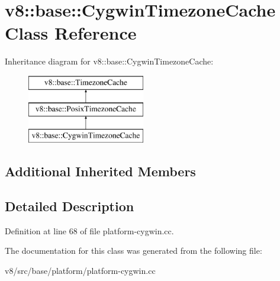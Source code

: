 \hypertarget{classv8_1_1base_1_1CygwinTimezoneCache}{}\section{v8\+:\+:base\+:\+:Cygwin\+Timezone\+Cache Class Reference}
\label{classv8_1_1base_1_1CygwinTimezoneCache}
Inheritance diagram for v8\+:\+:base\+:\+:Cygwin\+Timezone\+Cache\+:\begin{figure}[H]
\begin{center}
\leavevmode
\includegraphics[height=3.000000cm]{classv8_1_1base_1_1CygwinTimezoneCache}
\end{center}
\end{figure}
\subsection*{Additional Inherited Members}


\subsection{Detailed Description}


Definition at line 68 of file platform-\/cygwin.\+cc.



The documentation for this class was generated from the following file\+:\begin{DoxyCompactItemize}
\item 
v8/src/base/platform/platform-\/cygwin.\+cc\end{DoxyCompactItemize}

